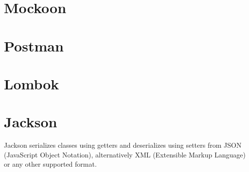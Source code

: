 \section{Mockoon} \label{sec:mockoon}

\section{Postman} \label{sec:postman}

\section{Lombok} \label{sec:lombok}

\section{Jackson} \label{sec:jackson}
Jackson serializes classes using getters and deserializes using setters from JSON (JavaScript Object Notation), alternatively XML (Extensible Markup Language) or any other supported format.
